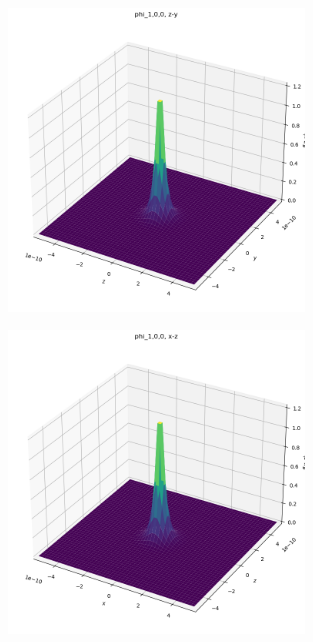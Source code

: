 \documentclass[ex, minted]{exercise_4.0}
\begin{document}
\section{}
\section{}

\section{}

\begin{figure}[H]
    \centering
    \includegraphics[width=0.7\textwidth]{1.1.png}
\end{figure}

\begin{figure}[H]
    \centering
    \includegraphics[width=0.7\textwidth]{1.2.png}
\end{figure}
\end{document}
